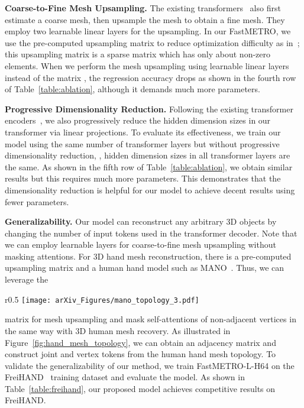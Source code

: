\noindent \textbf{Coarse-to-Fine Mesh Upsampling.}
The existing transformers~\cite{lin2021metro,lin2021graphormer} also first estimate a coarse mesh, then upsample the mesh to obtain a fine mesh.
They employ two learnable linear layers for the upsampling.
In our FastMETRO, we use the pre-computed upsampling matrix  to reduce optimization difficulty as in~\cite{kolotouros2019cmr};
this upsampling matrix is a sparse matrix which has only about  \mbox{non-zero} elements.
When we perform the mesh upsampling using learnable linear layers instead of the matrix ,
the regression accuracy drops as shown in the fourth row of Table~\ref{table:ablation},
although it demands much more parameters.

\noindent \textbf{Progressive Dimensionality Reduction.}
Following the existing transformer encoders~\cite{lin2021metro,lin2021graphormer}, 
we also progressively reduce the hidden dimension sizes in our transformer via linear projections.
To evaluate its effectiveness, 
we train our model using the same number of transformer layers but without progressive dimensionality reduction, \ie, hidden dimension sizes in all transformer layers are the same.
As shown in the fifth row of Table~\ref{table:ablation},
we obtain similar results but this requires much more parameters.
This demonstrates that the dimensionality reduction is helpful for our model to achieve decent results using fewer parameters.


\noindent \textbf{Generalizability.}
Our model can reconstruct any arbitrary 
3D objects by changing the number of input tokens used in the transformer 
decoder.
Note that we can employ learnable layers for coarse-to-fine mesh upsampling without masking attentions.
For 3D hand mesh reconstruction, there is a pre-computed upsampling matrix and a human hand model such as MANO~\cite{MANO:SIGGRAPHASIA:2017}. 
Thus, we can leverage the 
\begin{wrapfigure}{r}{0.5\textwidth}
    \centering
    \texttt{[image: arXiv\_Figures/mano\_topology\_3.pdf]}
    \caption{
        Hand Joints and Mesh Topology.
    }
    \label{fig:hand_mesh_topology}
\end{wrapfigure}
matrix for mesh upsampling and mask self-attentions of non-adjacent vertices in the same way with 3D human mesh recovery.
As illustrated in Figure~\ref{fig:hand_mesh_topology}, we can obtain an adjacency matrix and construct 
joint and vertex tokens from the human hand mesh topology. 
To validate the generalizability of our method,
we train FastMETRO-L-H64 on the \mbox{FreiHAND}~\cite{zimmermann2019freihand} training
dataset and evaluate the model.
As shown in Table~\ref{table:freihand}, our proposed model achieves competitive results on FreiHAND.

